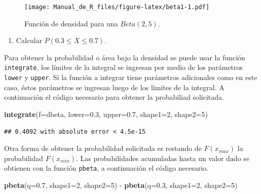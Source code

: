 \documentclass[10pt,]{krantz}
\makeatletter
\newenvironment{Shaded}{\begin{snugshade}}{\end{snugshade}}
\newcommand{\KeywordTok}[1]{\textcolor[rgb]{0.13,0.29,0.53}{\textbf{{#1}}}}
\newcommand{\DataTypeTok}[1]{\textcolor[rgb]{0.13,0.29,0.53}{{#1}}}
\newcommand{\DecValTok}[1]{\textcolor[rgb]{0.00,0.00,0.81}{{#1}}}
\newcommand{\FloatTok}[1]{\textcolor[rgb]{0.00,0.00,0.81}{{#1}}}
\newcommand{\StringTok}[1]{\textcolor[rgb]{0.31,0.60,0.02}{{#1}}}
\newcommand{\NormalTok}[1]{{#1}}
\providecommand{\tightlist}{%
  \setlength{\itemsep}{0pt}\setlength{\parskip}{0pt}}
\newenvironment{kframe}{%
\medskip{}
\setlength{\fboxsep}{.8em}
 \def\at@end@of@kframe{}%
 \ifinner\ifhmode%
  \def\at@end@of@kframe{\end{minipage}}%
  \begin{minipage}{\columnwidth}%
 \fi\fi%
 \def\FrameCommand##1{\hskip\@totalleftmargin \hskip-\fboxsep
 \colorbox{shadecolor}{##1}\hskip-\fboxsep
     \hskip-\linewidth \hskip-\@totalleftmargin \hskip\columnwidth}%
 \MakeFramed {\advance\hsize-\width
   \@totalleftmargin\z@ \linewidth\hsize
   \@setminipage}}%
 {\par\unskip\endMakeFramed%
 \at@end@of@kframe}
\renewenvironment{Shaded}{\begin{kframe}}{\end{kframe}}
\makeatother
\begin{document}
\begin{figure}[htbp]
\centering
\texttt{[image: Manual\_de\_R\_files/figure-latex/beta1-1.pdf]}
\caption{\label{fig:beta1}Función de densidad para una \(Beta(2, 5)\).}
\end{figure}

\begin{enumerate}
\def\labelenumi{\arabic{enumi})}
\setcounter{enumi}{1}
\tightlist
\item
  Calcular \(P(0.3 \leq X \leq 0.7)\).
\end{enumerate}

Para obtener la probabilidad o área bajo la densidad se puede usar la
función \texttt{integrate}, los límites de la integral se ingresan por
medio de los parámetros \texttt{lower} y \texttt{upper}. Si la función a
integrar tiene parámetros adicionales como en este caso, éstos
parámetros se ingresan luego de los límites de la integral. A
continuación el código necesario para obtener la probabiliad solicitada.

\begin{Shaded}
\begin{Highlighting}[]
\KeywordTok{integrate}\NormalTok{(}\DataTypeTok{f=}\NormalTok{dbeta, }\DataTypeTok{lower=}\FloatTok{0.3}\NormalTok{, }\DataTypeTok{upper=}\FloatTok{0.7}\NormalTok{,}
          \DataTypeTok{shape1=}\DecValTok{2}\NormalTok{, }\DataTypeTok{shape2=}\DecValTok{5}\NormalTok{)}
\end{Highlighting}
\end{Shaded}

\begin{verbatim}
## 0.4092 with absolute error < 4.5e-15
\end{verbatim}

Otra forma de obtener la probabilidad solicitada es restando de
\(F(x_{max})\) la probabilidad \(F(x_{min})\). Las probabilidades
acumuladas hasta un valor dado se obtienen con la función
\texttt{pbeta}, a continuación el código necesario.

\begin{Shaded}
\begin{Highlighting}[]
\KeywordTok{pbeta}\NormalTok{(}\DataTypeTok{q=}\FloatTok{0.7}\NormalTok{, }\DataTypeTok{shape1=}\DecValTok{2}\NormalTok{, }\DataTypeTok{shape2=}\DecValTok{5}\NormalTok{) -}\StringTok{ }\KeywordTok{pbeta}\NormalTok{(}\DataTypeTok{q=}\FloatTok{0.3}\NormalTok{, }\DataTypeTok{shape1=}\DecValTok{2}\NormalTok{, }\DataTypeTok{shape2=}\DecValTok{5}\NormalTok{)}
\end{Highlighting}
\end{Shaded}
\end{document}
